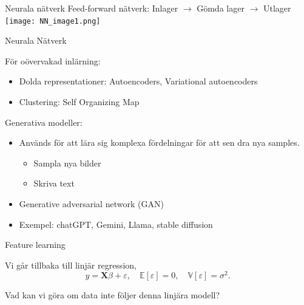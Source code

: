\documentclass[10pt,english]{beamer}
\begin{document}
\begin{frame}{Neurala nätverk}
    Feed-forward nätverk: Inlager $\rightarrow$ Gömda lager $\rightarrow$ Utlager
    \texttt{[image: NN\_image1.png]}

\end{frame}


\begin{frame}{Neurala Nätverk}

    För oövervakad inlärning:
    \begin{itemize}
        \item Dolda representationer: Autoencoders, Variational autoencoders
        \item Clustering: Self Organizing Map
    \end{itemize}

    Generativa modeller:
    \begin{itemize}
        \item Används för att lära sig komplexa fördelningar för att sen dra nya samples.
        \begin{itemize}
            \item Sampla nya bilder
            \item Skriva text
        \end{itemize}
        \item Generative adversarial network (GAN)
        \item Exempel: chatGPT, Gemini, Llama, stable diffusion
    \end{itemize}
    
\end{frame}

\begin{frame}{Feature learning}

    Vi går tillbaka till linjär regression,
    \begin{equation*}
        y = \mathbf{X} \beta + \varepsilon, \quad \mathbb{E}[\varepsilon] = 0, \quad \mathbb{V}[\varepsilon] = \sigma^2.
    \end{equation*}
    
    Vad kan vi göra om data inte följer denna linjära modell?

\end{frame}
\end{document}
